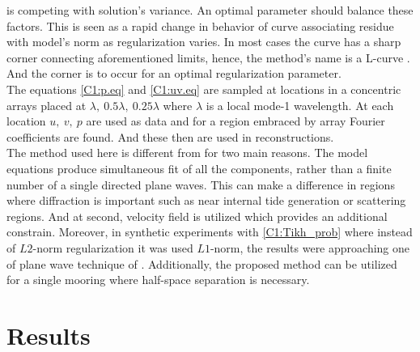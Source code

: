 \documentclass[12pt]{article}
\begin{document}
is competing with solution's variance. An optimal parameter should balance these factors. This is 
seen as a rapid change in behavior of curve associating residue with model's norm as regularization 
varies. In most cases the curve has a sharp corner connecting aforementioned limits, hence, the 
method's name is a L-curve \citep{hansen1999curve}. And the corner is to occur for an optimal 
regularization parameter.\\
The equations \eqref{C1:p.eq} and \eqref{C1:uv.eq} are sampled at locations in a concentric 
arrays placed at $\lambda,~0.5\lambda,~0.25\lambda$ where $\lambda$ is a local mode-1 wavelength. 
At each location $u,~v,~p$ are used as data and for a region embraced by array Fourier coefficients 
are found. And these then are used in reconstructions.\\
The method used here is different from \citep{zhao2010long} for two main reasons. The model 
equations produce simultaneous fit of all the components, rather than a finite number of a single 
directed plane waves. This can make a difference in regions where diffraction is important such as 
near internal tide generation or scattering regions. And at second, velocity field is utilized 
which provides an additional constrain. Moreover, in synthetic experiments with 
\eqref{C1:Tikh_prob} where instead of $L2$-norm regularization it was used $L1$-norm, the results 
were approaching one of plane wave technique of \citep{zhao2010long}. Additionally, the proposed 
method can be utilized for a single mooring where half-space separation is necessary.

\section{Results}
\end{document}
